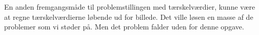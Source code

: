 En anden fremgangsmåde til problemstillingen med tærskelværdier, kunne
være at regne tærskelværdierne løbende ud for billede. Det ville
løsen en masse af de problemer som vi støder på. Men det problem falder
uden for denne opgave.


